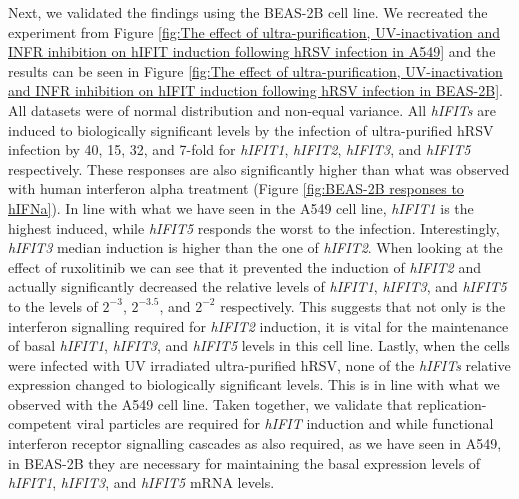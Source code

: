 Next, we validated the findings using the BEAS-2B cell line. We recreated the experiment from Figure \ref{fig:The effect of ultra-purification, UV-inactivation and INFR inhibition on hIFIT induction following hRSV infection in A549} and the results can be seen in Figure \ref{fig:The effect of ultra-purification, UV-inactivation and INFR inhibition on hIFIT induction following hRSV infection in BEAS-2B}. All datasets were of normal distribution and non-equal variance. All \textit{hIFITs} are induced to biologically significant levels by the infection of ultra-purified hRSV infection by 40, 15, 32, and 7-fold for \textit{hIFIT1}, \textit{hIFIT2}, \textit{hIFIT3}, and \textit{hIFIT5} respectively. These responses are also significantly higher than what was observed with human interferon alpha treatment (Figure \ref{fig:BEAS-2B responses to hIFNa}). In line with what we have seen in the A549 cell line, \textit{hIFIT1} is the highest induced, while \textit{hIFIT5} responds the worst to the infection. Interestingly, \textit{hIFIT3} median induction is higher than the one of \textit{hIFIT2}. When looking at the effect of ruxolitinib we can see that it prevented the induction of \textit{hIFIT2} and actually significantly decreased the relative levels of \textit{hIFIT1}, \textit{hIFIT3}, and \textit{hIFIT5} to the levels of \(2^{-3}\), \(2^{-3.5}\), and \(2^{-2}\) respectively. This suggests that not only is the interferon signalling required for \textit{hIFIT2} induction, it is vital for the maintenance of basal \textit{hIFIT1}, \textit{hIFIT3}, and \textit{hIFIT5} levels in this cell line. Lastly, when the cells were infected with UV irradiated ultra-purified hRSV, none of the \textit{hIFITs} relative expression changed to biologically significant levels. This is in line with what we observed with the A549 cell line. Taken together, we validate that replication-competent viral particles are required for \textit{hIFIT} induction and while functional interferon receptor signalling cascades as also required, as we have seen in A549, in BEAS-2B they are necessary for maintaining the basal expression levels of \textit{hIFIT1}, \textit{hIFIT3}, and \textit{hIFIT5} mRNA levels.


